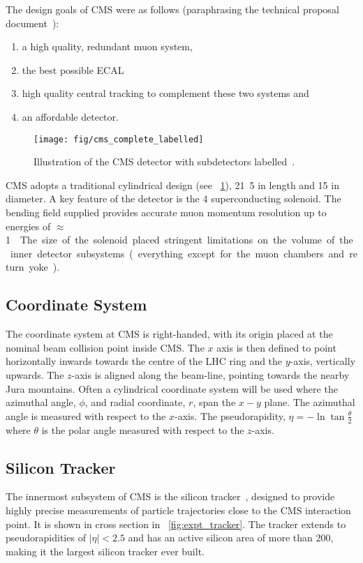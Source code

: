 The design goals of CMS were as follows (paraphrasing the technical proposal
document~\cite{cms_technical_proposal}):
\begin{enumerate}
\item a high quality, redundant muon system,
\item the best possible \ac{ECAL}
\item high quality central tracking to complement these two systems and
\item an affordable detector.
\end{enumerate}

\begin{figure}[h!]
\centering
\texttt{[image: fig/cms\_complete\_labelled]}
\caption[Illustration of the \acs{CMS} detector]{Illustration of the \ac{CMS}
  detector with subdetectors labelled~\cite{cms_jinst}.}
\label{fig:expt_cms}
\end{figure}

\ac{CMS} adopts a traditional cylindrical design (see
\fig~\ref{fig:expt_cms}), \unit{21.5}{\metre} in length and \unit{15}{\metre}
in diameter. A key feature of the detector is the \unit{4}{\tesla}
superconducting solenoid. The bending field supplied provides accurate muon
momentum resolution up to energies of \unit{$\approx$ 1}{\TeV}. The size of the
solenoid placed stringent limitations on the volume of the inner detector
subsystems (everything except for the muon chambers and return yoke).

\subsection{Coordinate System}
The coordinate system at \ac{CMS} is right-handed, with its origin placed at the
nominal beam collision point inside \ac{CMS}. The $x$ axis is then defined to
point horizontally inwards towards the centre of the \ac{LHC} ring and the
$y$-axis, vertically upwards. The $z$-axis is aligned along the beam-line,
pointing towards the nearby Jura mountains. Often a cylindrical coordinate
system will be used where the azimuthal angle, $\phi$, and radial
coordinate, $r$, span the $x-y$ plane. The azimuthal angle is measured with
respect to the $x$-axis. The pseudorapidity, $\eta = - \ln \tan
\frac{\theta}{2}$ where $\theta$ is the polar angle measured with respect to the
$z$-axis.

\subsection{Silicon Tracker}
The innermost subsystem of \ac{CMS} is the silicon tracker~\cite{tracker_paper},
designed to provide highly precise measurements of particle trajectories close
to the CMS interaction point. It is shown in cross section in
\fig~\ref{fig:expt_tracker}. The tracker extends to pseudorapidities of
$|\eta|<2.5$ and has an active silicon area of more than
\unit{200}{\metre\squared}, making it the largest silicon tracker ever built.

